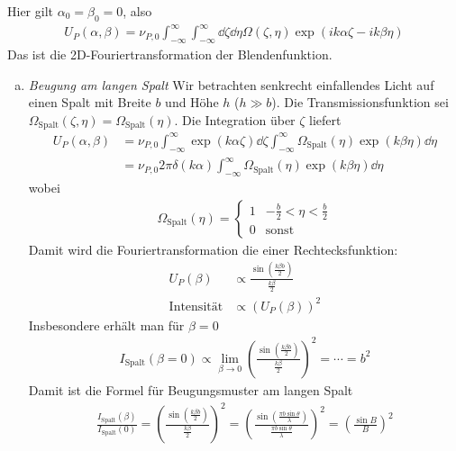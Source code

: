 Hier gilt $\alpha_0=\beta_0=0$, also
\begin{gather*}
  U_P(\alpha,\beta) 
  = \nu_{P,0} \int_{-\infty}^{\infty}\int_{-\infty}^{\infty}
    \dd\zeta\dd\eta \Omega(\zeta,\eta)
  \exp\left( ik\alpha\zeta - ik\beta\eta \right)
\end{gather*}
Das ist die 2D-Fouriertransformation der Blendenfunktion.

\begin{enumerate}[a)]
\item \emph{Beugung am langen Spalt}
Wir betrachten senkrecht einfallendes Licht auf einen Spalt mit Breite
$b$ und Höhe $h$ ($h\gg b$). Die Transmissionsfunktion sei 
$\Omega_\text{Spalt}(\zeta,\eta) = \Omega_\text{Spalt}(\eta)$.
Die Integration über $\zeta$ liefert
\begin{align*}
  U_P(\alpha,\beta) 
  &= \nu_{P,0} 
  \int_{-\infty}^{\infty} \exp(k\alpha\zeta)\dd\zeta
  \int_{-\infty}^{\infty} \Omega_\text{Spalt}(\eta)\exp(k\beta\eta)\dd\eta\\
  &= \nu_{P,0} 2\pi\delta(k\alpha)
    \int_{-\infty}^{\infty} \Omega_\text{Spalt}(\eta)\exp(k\beta\eta)\dd\eta
\end{align*}
wobei
\begin{gather*}
  \Omega_\text{Spalt}(\eta) = 
  \begin{cases}
    1 & -\frac{b}{2} < \eta < \frac{b}{2}\\
    0 & \text{sonst}
  \end{cases}
\end{gather*}
Damit wird die Fouriertransformation die einer Rechtecksfunktion:
\begin{align*}
  U_P(\beta) 
  &\propto \frac{\sin(\frac{k\beta b}{2})}{\frac{k\beta}{2}}\\
  \text{Intensität}
  &\propto (U_P(\beta))^2
\end{align*}
Insbesondere erhält man für $\beta=0$ 
\begin{gather*}
  I_\text{Spalt}(\beta=0) 
  \propto \lim_{\beta\to0} \left(
    \frac{\sin(\frac{k\beta b}{2})}{\frac{k\beta}{2}}
    \right)^2
    = \dotsb = b^2
\end{gather*}
Damit ist die Formel für Beugungsmuster am langen Spalt
\begin{gather*}
  \frac{I_\text{Spalt}(\beta)}{I_\text{Spalt}(0)}
  = \left(
    \frac{\sin(\frac{k\beta b}{2})}{\frac{k\beta}{2}}
  \right)^2
  = \left(
    \frac{\sin(\frac{\pi b\sin\theta}{\lambda})}
    {\frac{\pi b\sin\theta}{\lambda}}
  \right)^2
  = \left(\frac{\sin B}{B}\right)^2
\end{gather*}


\end{enumerate}
